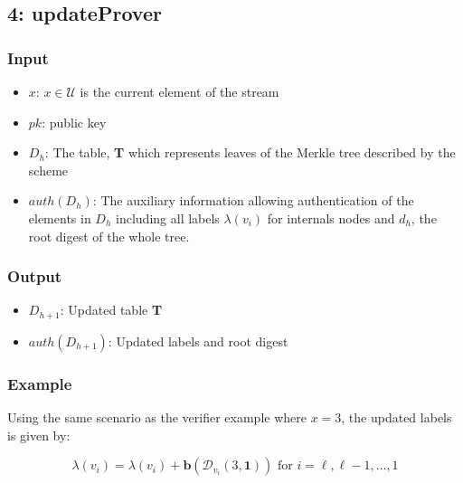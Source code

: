 \documentclass[11pt, letterpaper, oneside]{article}
\begin{document}

\subsection{ 4: updateProver}
\subsubsection{Input}
\begin{itemize}
\item $x$: $x \in \mathcal{U}$ is the current element of the stream
\item $pk$:  public key
\item $D_{h}$: The table, \textbf{T} which represents leaves of the Merkle tree described by the scheme
\item $auth(D_{h})$: The auxiliary information allowing authentication of the elements in $D_{h}$ including all labels $\lambda(v_{i})$ for internals nodes and $d_{h}$, the root digest of the whole tree.
\end{itemize}
\subsubsection{Output}

\begin{itemize}
\item $D_{h + 1}$: Updated table \textbf{T}
\item $auth(D_{h + 1})$: Updated labels and root digest
\end{itemize}

\subsubsection{Example}

Using the same scenario as the verifier example where $x = 3$, the updated labels is given by:

\begin{equation}
\lambda(v_{i}) = \lambda(v_{i}) + \textbf{b}( \mathcal{D}_{v_{i}}(3, \textbf{1}) ) \textrm{ for } i = \ell, \ell -1, \ldots, 1
\end{equation}
\end{document}
